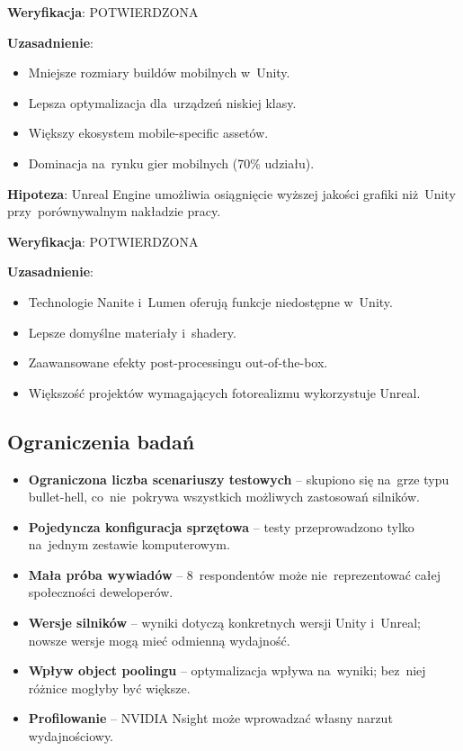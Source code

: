 \textbf{Weryfikacja}: POTWIERDZONA

\textbf{Uzasadnienie}:
\begin{itemize}
    \item Mniejsze rozmiary buildów mobilnych w~Unity.
    \item Lepsza optymalizacja dla~urządzeń niskiej klasy.
    \item Większy ekosystem mobile-specific assetów.
    \item Dominacja na~rynku gier mobilnych (70\% udziału).
\end{itemize}


\textbf{Hipoteza}: Unreal Engine umożliwia osiągnięcie wyższej jakości grafiki niż~Unity przy~porównywalnym nakładzie pracy.

\textbf{Weryfikacja}: POTWIERDZONA

\textbf{Uzasadnienie}:
\begin{itemize}
    \item Technologie Nanite i~Lumen oferują funkcje niedostępne w~Unity.
    \item Lepsze domyślne materiały i~shadery.
    \item Zaawansowane efekty post-processingu out-of-the-box.
    \item Większość projektów wymagających fotorealizmu wykorzystuje Unreal.
\end{itemize}

\subsection{Ograniczenia badań}


\begin{itemize}
    \item \textbf{Ograniczona liczba scenariuszy testowych} -- skupiono się na~grze typu bullet-hell, co~nie~pokrywa wszystkich możliwych zastosowań silników.
    \item \textbf{Pojedyncza konfiguracja sprzętowa} -- testy przeprowadzono tylko na~jednym zestawie komputerowym.
    \item \textbf{Mała próba wywiadów} -- 8~respondentów może nie~reprezentować całej społeczności deweloperów.
\end{itemize}


\begin{itemize}
    \item \textbf{Wersje silników} -- wyniki dotyczą konkretnych wersji Unity i~Unreal; nowsze wersje mogą mieć odmienną wydajność.
    \item \textbf{Wpływ object poolingu} -- optymalizacja wpływa na~wyniki; bez~niej różnice mogłyby być większe.
    \item \textbf{Profilowanie} -- NVIDIA Nsight może wprowadzać własny narzut wydajnościowy.
\end{itemize}


